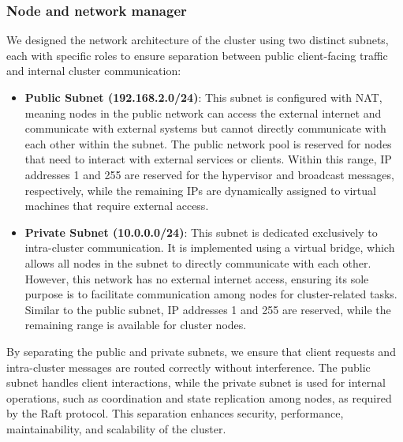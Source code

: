 \subsubsection{Node and network manager}
We designed the network architecture of the cluster using two distinct subnets, each with specific 
roles to ensure separation between public client-facing traffic and internal cluster communication:
\begin{itemize}
	\item \textbf{Public Subnet (192.168.2.0/24)}:
    This subnet is configured with NAT, meaning nodes in the public network can access the external 
    internet and communicate with external systems but cannot directly communicate with each other within the subnet.
    The public network pool is reserved for nodes that need to interact with external services or 
    clients. Within this range, IP addresses 1 and 255 are reserved for the hypervisor and broadcast 
    messages, respectively, while the remaining IPs are dynamically assigned to virtual machines that require external access.

  \item \textbf{Private Subnet (10.0.0.0/24)}:
    This subnet is dedicated exclusively to intra-cluster communication. It is implemented using 
    a virtual bridge, which allows all nodes in the subnet to directly communicate with each other. 
    However, this network has no external internet access, ensuring its sole purpose is to facilitate 
    communication among nodes for cluster-related tasks.
    Similar to the public subnet, IP addresses 1 and 255 are reserved, while the remaining range 
    is available for cluster nodes.
\end{itemize}
By separating the public and private subnets, we ensure that client requests and intra-cluster messages
are routed correctly without interference. The public subnet handles client interactions, while the 
private subnet is used for internal operations, such as coordination and state replication among nodes,
as required by the Raft protocol.
This separation enhances security, performance, maintainability, and scalability of the cluster.

